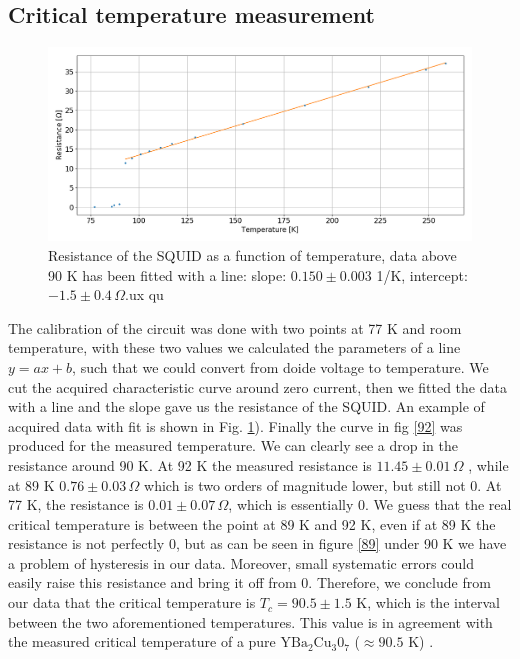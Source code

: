 \documentclass[a4paper,10pt]{article}
\begin{document}
\subsection{Critical temperature measurement}
\begin{figure}[H]
\centering
\includegraphics[width = \textwidth]{img/tempR.png}
\caption{Resistance of the SQUID as a function of temperature, data above 90 K has been fitted with a line: slope: $0.150\pm 0.003$ 1/K, intercept: $-1.5\pm0.4\,\Omega$.ux qu}\label{resistance}
\end{figure}
The calibration of the circuit was done with two points at 77 K and room temperature, with these two values we calculated the parameters of a line $y=ax+b$, such that we could convert from doide voltage to temperature. We cut the acquired characteristic curve around zero current, then we fitted the data with a line and the slope gave us the resistance of the SQUID. An example of acquired data with fit is shown in Fig. \ref{resistance}). Finally the curve in fig \ref{92} was produced for the measured temperature. We can clearly see a drop in the resistance around 90 K. 
At 92 K the measured resistance is $11.45 \pm  0.01 \, \Omega$ , while at 89 K $0.76\pm 0.03\, \Omega$ which is two orders of magnitude lower, but still not 0. At 77 K, the resistance is
$0.01\pm 0.07\, \Omega$, which is essentially 0. We guess that the real critical temperature is between the point at 89 K and 92 K, even if at 89 K the resistance is not perfectly 0, but as can be seen in figure \ref{89} under 90 K we have a problem of hysteresis in our data. Moreover, small systematic errors could easily raise this resistance and bring it off from 0. Therefore, we conclude from our data that the critical temperature is $T_c = 90.5 \pm 1.5$ K, which is the interval between the two aforementioned temperatures. This value is in agreement with the measured critical temperature of a pure $\text{YBa}_2\text{Cu}_3\text{0}_7$  ($\approx 90.5$ K) \cite{criticaltemperature}.
\end{document}
